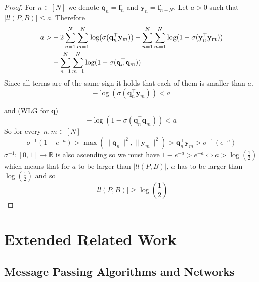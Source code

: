 \documentclass[letterpaper]{article} %
\begin{document}
   \begin{proof}
    
For $n\in[N]$ we denote $\mathbf{q}_n=\mathbf{f}_n$ and  $\mathbf{y}_n=\mathbf{f}_{n+N}$.
Let $a > 0$ such that $|ll(P, B)| \leq a$.
Therefore
    \begingroup
    \footnotesize
    \begin{align}
    a >&  -2\sum\limits_{n=1}^N\sum\limits_{m=1}^N\log(\sigma(\mathbf{q}_n^\top\mathbf{y}_m)) - \sum\limits_{n=1}^N\sum\limits_{m=1}^N\log(1 - \sigma(\mathbf{y}_n^\top \mathbf{y}_m)) \notag\\
    &- \sum\limits_{n=1}^N\sum\limits_{m=1}^N\log(1 - \sigma(\mathbf{q}_n^\top \mathbf{q}_m))
    \end{align}
    \endgroup
Since all terms are of the same sign it holds that each of them is smaller than $a$.
\begin{equation}
\label{eq:small_1st}
-\log(\sigma(\mathbf{q}_n^\top \mathbf{y}_m))< a
\end{equation}

and (WLG for $\mathbf{q}$)
\begin{equation}
\label{eq:small_2nd}
-\log(1-\sigma(\mathbf{q}_n^\top \mathbf{q}_m))< a
\end{equation}
So for every $n,m \in [N]$
\[\sigma^{-1}(1-e^{-a})>\max(\|\mathbf{q}_n\|^2, \|\mathbf{y}_m\|^2)>\mathbf{q}_n^\top\mathbf{y}_m>\sigma^{-1}(e^{-a})\]
$\sigma^{-1}: [0,1] \rightarrow \mathbb{R}$ is also ascending so we must have $1-e^{-a} > e^{-a} \iff a> \log(\frac{1}{2})$ which means that for $a$ to be larger than $|ll(P,B)|$, $a$ has to be larger than $\log(\frac{1}{2})$ and so
\[|ll(P,B)|\geq\log(\frac{1}{2})\]

\end{proof}

\endgroup

\section{Extended Related Work}
\label{Extended Related Work}





\subsection{Message Passing Algorithms and Networks}


\end{document}
